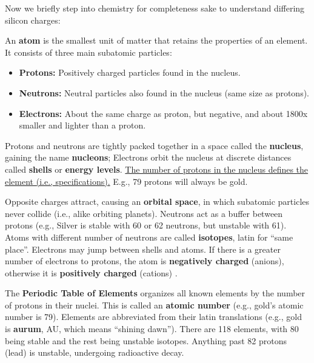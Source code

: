 \noindent 
Now we briefly step into chemistry for completeness sake to understand differing silicon charges:
\begin{Def}

    \label{def:atom}

    An \textbf{atom} is the smallest unit of matter that retains the properties of an element. It consists of three main subatomic particles:
    \begin{itemize}
        \item \textbf{Protons:} Positively charged particles found in the nucleus.
        \item \textbf{Neutrons:} Neutral particles also found in the nucleus (same size as protons).
        \item \textbf{Electrons:} About the same charge as proton, but negative, and about 1800x smaller and lighter than a proton.
    \end{itemize}

    \noindent
    Protons and neutrons are tightly packed together in a space called the \textbf{nucleus}, gaining the name \textbf{nucleons};
    Electrons orbit the nucleus at discrete distances called \textbf{shells} or \textbf{energy levels}. 
    \underline{The number of protons in the nucleus defines the element (i.e., specifications).} E.g., 79 protons will 
    always be gold.

    Opposite charges attract, causing an \textbf{orbital space}, in which subatomic particles never collide (i.e., alike orbiting planets). Neutrons act as a buffer between protons (e.g., Silver is 
    stable with 60 or 62 neutrons, but unstable with 61). Atoms with different number of neutrons are called \textbf{isotopes}, latin for ``same place''.
    Electrons may jump between shells and atoms. If there is a greater number of electrons to protons, the atom is \textbf{negatively charged} (anions), otherwise it is \textbf{positively charged} (cations)
    \cite{crashcourse2013nucleus}.
\end{Def}

\begin{Def}

    \label{def:periodic_table}

    The \textbf{Periodic Table of Elements} organizes all known elements by the number of protons in their nuclei. This is called an \textbf{atomic number} (e.g., 
    gold's atomic number is 79). Elements are abbreviated from their latin translations (e.g., gold is \textbf{aurum}, AU, which means ``shining dawn'').
    There are 118 elements, with 80 being stable and the rest being unstable isotopes. Anything past 82 protons (lead) is 
    unstable, undergoing radioactive decay.
\end{Def}

